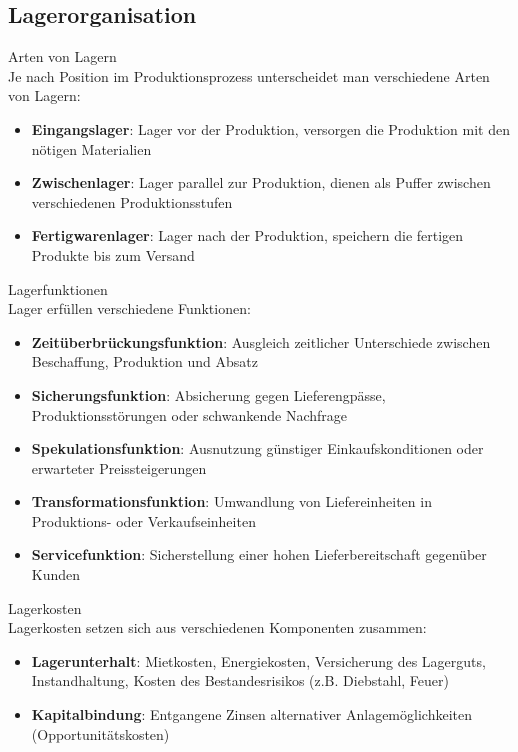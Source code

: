 \subsection{Lagerorganisation}

\begin{definition}{Arten von Lagern}\\
Je nach Position im Produktionsprozess unterscheidet man verschiedene Arten von Lagern:
\begin{itemize}
    \item \textbf{Eingangslager}: Lager vor der Produktion, versorgen die Produktion mit den nötigen Materialien
    \item \textbf{Zwischenlager}: Lager parallel zur Produktion, dienen als Puffer zwischen verschiedenen Produktionsstufen
    \item \textbf{Fertigwarenlager}: Lager nach der Produktion, speichern die fertigen Produkte bis zum Versand
\end{itemize}
\end{definition}

\begin{definition}{Lagerfunktionen}\\
Lager erfüllen verschiedene Funktionen:
\begin{itemize}
    \item \textbf{Zeitüberbrückungsfunktion}: Ausgleich zeitlicher Unterschiede zwischen Beschaffung, Produktion und Absatz
    \item \textbf{Sicherungsfunktion}: Absicherung gegen Lieferengpässe, Produktionsstörungen oder schwankende Nachfrage
    \item \textbf{Spekulationsfunktion}: Ausnutzung günstiger Einkaufskonditionen oder erwarteter Preissteigerungen
    \item \textbf{Transformationsfunktion}: Umwandlung von Liefereinheiten in Produktions- oder Verkaufseinheiten
    \item \textbf{Servicefunktion}: Sicherstellung einer hohen Lieferbereitschaft gegenüber Kunden
\end{itemize}
\end{definition}

\begin{definition}{Lagerkosten}\\
Lagerkosten setzen sich aus verschiedenen Komponenten zusammen:
\begin{itemize}
    \item \textbf{Lagerunterhalt}: Mietkosten, Energiekosten, Versicherung des Lagerguts, Instandhaltung, Kosten des Bestandesrisikos (z.B. Diebstahl, Feuer)
    \item \textbf{Kapitalbindung}: Entgangene Zinsen alternativer Anlagemöglichkeiten (Opportunitätskosten)
\end{itemize}
\end{definition}

